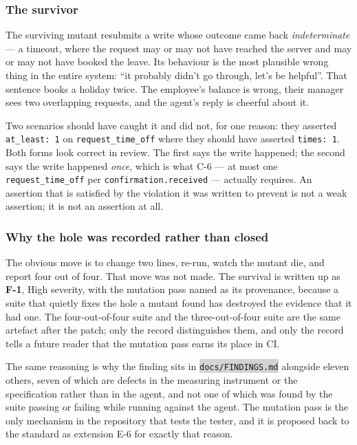 \documentclass[11pt,a4paper]{article}
\newcommand{\repopath}[1]{\colorbox{lightgray}{\texttt{#1}}}
\newcommand{\finding}[1]{{\color{primaryblue}\textbf{#1}}}
\begin{document}
\subsubsection*{The survivor}

The surviving mutant resubmits a write whose outcome came back \emph{indeterminate} --- a timeout, where the request may or may not have reached the server and may or may not have booked the leave. Its behaviour is the most plausible wrong thing in the entire system: ``it probably didn't go through, let's be helpful''. That sentence books a holiday twice. The employee's balance is wrong, their manager sees two overlapping requests, and the agent's reply is cheerful about it.

Two scenarios should have caught it and did not, for one reason: they asserted \texttt{at\_least: 1} on \texttt{request\_time\_off} where they should have asserted \texttt{times: 1}. Both forms look correct in review. The first says the write happened; the second says the write happened \emph{once}, which is what C-6 --- at most one \texttt{request\_time\_off} per \texttt{confirmation.received} --- actually requires. An assertion that is satisfied by the violation it was written to prevent is not a weak assertion; it is not an assertion at all.

\subsubsection*{Why the hole was recorded rather than closed}

The obvious move is to change two lines, re-run, watch the mutant die, and report four out of four. That move was not made. The survival is written up as \finding{F-1}, High severity, with the mutation pass named as its provenance, because a suite that quietly fixes the hole a mutant found has destroyed the evidence that it had one. The four-out-of-four suite and the three-out-of-four suite are the same artefact after the patch; only the record distinguishes them, and only the record tells a future reader that the mutation pass earns its place in CI.

The same reasoning is why the finding sits in \repopath{docs/FINDINGS.md} alongside eleven others, seven of which are defects in the measuring instrument or the specification rather than in the agent, and not one of which was found by the suite passing or failing while running against the agent. The mutation pass is the only mechanism in the repository that tests the tester, and it is proposed back to the standard as extension E-6 for exactly that reason.
\end{document}

